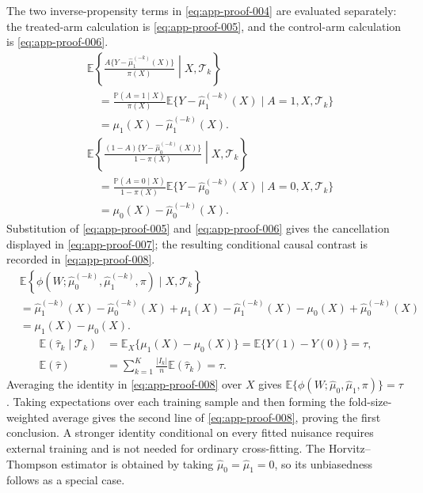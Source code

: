 \documentclass[11pt]{article}
\numberwithin{equation}{section}
\newcommand{\E}{\mathbb E}
\newcommand{\Pbb}{\mathbb P}
\newcommand{\1}{\mathbf 1}
\begin{document}
The two inverse-propensity terms in \eqref{eq:app-proof-004} are evaluated
separately: the treated-arm calculation is \eqref{eq:app-proof-005}, and
the control-arm calculation is \eqref{eq:app-proof-006}.
\begin{equation}
\label{eq:app-proof-005}
\begin{aligned}
&\E\!\left\{
\frac{A\{Y-\widehat\mu_1^{(-k)}(X)\}}{\pi(X)}
\middle|X,\mathcal T_k
\right\}\\
&\quad=\frac{\Pbb(A=1\mid X)}{\pi(X)}
\E\{Y-\widehat\mu_1^{(-k)}(X)\mid A=1,X,\mathcal T_k\}\\
&\quad=\mu_1(X)-\widehat\mu_1^{(-k)}(X).
\end{aligned}
\end{equation}
\begin{equation}
\label{eq:app-proof-006}
\begin{aligned}
&\E\!\left\{
\frac{(1-A)\{Y-\widehat\mu_0^{(-k)}(X)\}}{1-\pi(X)}
\middle|X,\mathcal T_k
\right\}\\
&\quad=\frac{\Pbb(A=0\mid X)}{1-\pi(X)}
\E\{Y-\widehat\mu_0^{(-k)}(X)\mid A=0,X,\mathcal T_k\}\\
&\quad=\mu_0(X)-\widehat\mu_0^{(-k)}(X).
\end{aligned}
\end{equation}
Substitution of \eqref{eq:app-proof-005} and
\eqref{eq:app-proof-006} gives the cancellation displayed in
\eqref{eq:app-proof-007}; the resulting conditional causal contrast is
recorded in \eqref{eq:app-proof-008}.
\begin{equation}
\label{eq:app-proof-007}
\begin{aligned}
&\E\!\left\{
\phi(W;\widehat\mu_0^{(-k)},\widehat\mu_1^{(-k)},\pi)
\mid X,\mathcal T_k
\right\}\\
&=\widehat\mu_1^{(-k)}(X)-\widehat\mu_0^{(-k)}(X)
 +\mu_1(X)-\widehat\mu_1^{(-k)}(X)
 -\mu_0(X)+\widehat\mu_0^{(-k)}(X)\\
&=\mu_1(X)-\mu_0(X).
\end{aligned}
\end{equation}
\begin{equation}
\label{eq:app-proof-008}
\begin{aligned}
\E(\widehat\tau_k\mid\mathcal T_k)
&=\E_X\{\mu_1(X)-\mu_0(X)\}
=\E\{Y(1)-Y(0)\}=\tau,\\
\E(\widehat\tau)
&=\sum_{k=1}^K\frac{|I_k|}{n}\E(\widehat\tau_k)
=\tau.
\end{aligned}
\end{equation}
Averaging the identity in \eqref{eq:app-proof-008} over \(X\) gives
\(\E\{\phi(W;\widehat\mu_0,\widehat\mu_1,\pi)\}=\tau\).  Taking expectations over each training sample and then forming the fold-size-weighted average gives the second line of \eqref{eq:app-proof-008}, proving the first conclusion.  A stronger identity conditional on every fitted nuisance requires external training and is not needed for ordinary cross-fitting.  The Horvitz--Thompson estimator is obtained by taking
\(\widehat\mu_0=\widehat\mu_1=0\), so its unbiasedness follows as a special
case.
\end{document}
